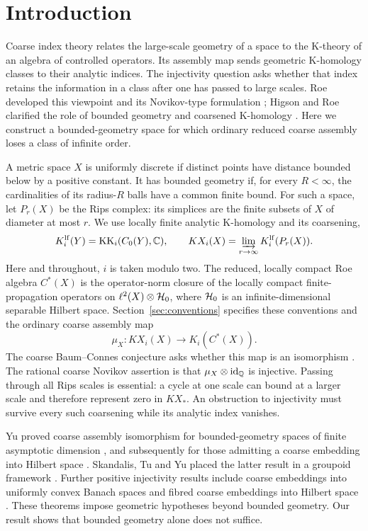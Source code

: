 \section{Introduction}

Coarse index theory relates the large-scale geometry of a space to the
K-theory of an algebra of controlled operators. Its assembly map sends
geometric K-homology classes to their analytic indices. The injectivity
question asks whether that index retains the information in a class after
one has passed to large scales. Roe developed this viewpoint and its
Novikov-type formulation \cite{Roe93}; Higson and Roe clarified
the role of bounded geometry and coarsened K-homology \cite{HR95}.
Here we construct a bounded-geometry space for which ordinary reduced
coarse assembly loses a class of infinite order.

A metric space $X$ is uniformly discrete if distinct points have distance
bounded below by a positive constant. It has bounded geometry if, for every
$R<\infty$, the cardinalities of its radius-$R$ balls have a common finite
bound. For such a space, let $P_r(X)$ be the Rips complex: its simplices are the
finite subsets of $X$ of diameter at most $r$. We use locally finite analytic
K-homology and its coarsening,
\[
 K_i^{\mathrm{lf}}(Y)=\operatorname{KK}_i(C_0(Y),\mathbb C),\qquad
 KX_i(X)=\varinjlim_{r\to\infty}K_i^{\mathrm{lf}}(P_r(X)).
\]
Here and throughout, $i$ is taken modulo two. The reduced, locally compact
Roe algebra $C^*(X)$ is the operator-norm closure of the locally compact
finite-propagation operators on $\ell^2(X)\otimes\mathcal H_0$, where $\mathcal H_0$ is an
infinite-dimensional separable Hilbert space. Section~\ref{sec:conventions}
specifies these conventions and the ordinary coarse assembly map
\[
 \mu_X:KX_i(X)\longrightarrow K_i(C^*(X)).
\]
The coarse Baum--Connes conjecture asks whether this map is an isomorphism
\cite[Conjecture~6.6]{HR95}. The rational coarse Novikov assertion is that
$\mu_X\otimes\mathrm{id}_{\mathbb Q}$ is injective. Passing through all Rips scales is
essential: a cycle at one scale can bound at a larger scale and therefore
represent zero in $KX_*$. An obstruction to injectivity must survive every
such coarsening while its analytic index vanishes.

Yu proved coarse assembly isomorphism for bounded-geometry spaces of finite
asymptotic dimension \cite[Theorem~7.1]{Yu98}, and subsequently for those admitting a
coarse embedding into Hilbert space \cite{Yu00}. Skandalis, Tu and Yu placed
the latter result in a groupoid framework \cite{STY02}. Further positive
injectivity results include coarse embeddings into uniformly convex Banach
spaces \cite[Theorem~1.1]{KY06} and fibred coarse embeddings into Hilbert space
\cite[Theorem~34]{FS14}. These theorems impose geometric hypotheses beyond bounded
geometry. Our result shows that bounded geometry alone does not suffice.


